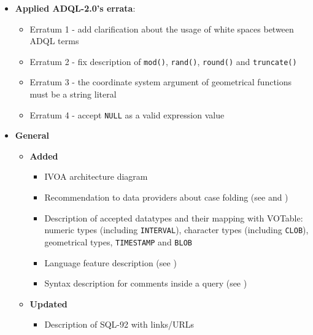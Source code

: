 \documentclass[11pt,a4paper]{ivoa}
\begin{document}
\begin{itemize}
    \item \textbf{Applied ADQL-2.0's errata}:
        \begin{itemize}
            \item Erratum 1 - add clarification about the usage of white spaces
                  between ADQL terms
            \item Erratum 2 - fix description of \verb:mod():, \verb:rand():,
                  \verb:round(): and \verb:truncate():
            \item Erratum 3 - the coordinate system argument of geometrical
                  functions must be a string literal
            \item Erratum 4 - accept \verb:NULL: as a valid expression value
        \end{itemize}
    \item \textbf{General}
        \begin{itemize}
            \item \textbf{Added}
                \begin{itemize}
                    \item IVOA architecture diagram 
                    \item Recommendation to data providers about case folding
                          (see  and
                          )
                    \item Description of accepted datatypes and their mapping
                          with VOTable: numeric types (including
                          \verb:INTERVAL:), character types (including
                          \verb:CLOB:), geometrical types, \verb:TIMESTAMP: and
                          \verb:BLOB: 
                    \item Language feature description
                          (see )
                    \item Syntax description for comments inside a query
                          (see )
                \end{itemize}
            \item \textbf{Updated}
                \begin{itemize}
                    \item Description of SQL-92 with links/URLs

\end{itemize}
\end{itemize}
\end{itemize}
\end{document}
